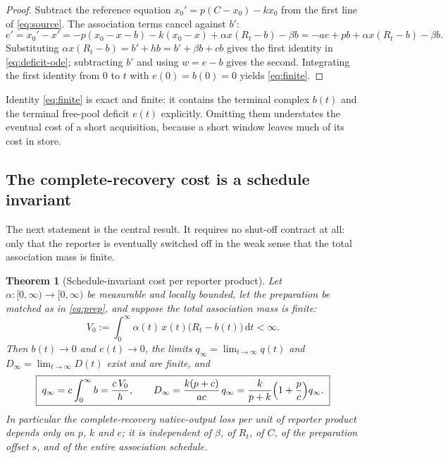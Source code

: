 \documentclass[11pt]{article}
\newtheorem{theorem}{Theorem}[section]
\theoremstyle{definition}
\theoremstyle{remark}
\newcommand{\dd}{\,\mathrm{d}}
\begin{document}
\begin{proof}
Subtract the reference equation $x_0'=p(C-x_0)-kx_0$ from the first line of
\eqref{eq:source}. The association terms cancel against $b'$:
\[
e'=x_0'-x'=-p(x_0-x-b)-k(x_0-x)+\alpha x(R_t-b)-\beta b
=-ae+pb+\alpha x(R_t-b)-\beta b .
\]
Substituting $\alpha x(R_t-b)=b'+hb=b'+\beta b+cb$ gives the first identity in
\eqref{eq:deficit-ode}; subtracting $b'$ and using $w=e-b$ gives the second.
Integrating the first identity from $0$ to $t$ with $e(0)=b(0)=0$ yields
\eqref{eq:finite}.
\end{proof}

Identity \eqref{eq:finite} is exact and finite: it contains the terminal complex
$b(t)$ and the terminal free-pool deficit $e(t)$ explicitly. Omitting them
understates the eventual cost of a short acquisition, because a short window
leaves much of its cost in store.

\subsection{The complete-recovery cost is a schedule invariant}

The next statement is the central result. It requires no shut-off contract at
all: only that the reporter is eventually switched off in the weak sense that
the total association mass is finite.

\begin{theorem}[Schedule-invariant cost per reporter product]\label{thm:invariant}
Let $\alpha:[0,\infty)\to[0,\infty)$ be measurable and locally bounded, let the
preparation be matched as in \eqref{eq:prep}, and suppose the total association
mass is finite:
\begin{equation}
V_0:=\int_0^\infty \alpha(t)\,x(t)\bigl(R_t-b(t)\bigr)\dd t<\infty .
\label{eq:exposure}
\end{equation}
Then $b(t)\to0$ and $e(t)\to0$, the limits
$q_\infty=\lim_{t\to\infty}q(t)$ and $D_\infty=\lim_{t\to\infty}D(t)$ exist and
are finite, and
\begin{equation}
\boxed{\;
q_\infty=c\int_0^\infty b=\frac{c\,V_0}{h},
\qquad
D_\infty=\frac{k(p+c)}{ac}\,q_\infty
=\frac{k}{p+k}\Bigl(1+\frac pc\Bigr)q_\infty .\;}
\label{eq:invariant}
\end{equation}
In particular the complete-recovery native-output loss per unit of reporter
product depends only on $p$, $k$ and $c$; it is independent of $\beta$, of
$R_t$, of $C$, of the preparation offset $s$, and of the entire association
schedule.
\end{theorem}
\end{document}
